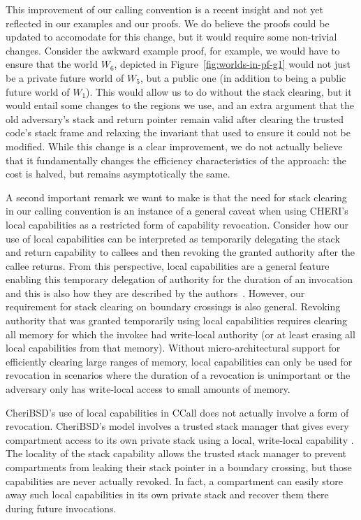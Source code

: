 \documentclass[format=acmsmall, review=true, screen=true]{acmart}
\begin{document}
This improvement of our calling convention is a recent insight and not yet reflected in our examples and our proofs.
We do believe the proofs could be updated to accomodate for this change, but it would require some non-trivial changes.
Consider the awkward example proof, for example, we would have to ensure that the world $W_6$, depicted in Figure~\ref{fig:worlds-in-pf-g1} would not just be a private future world of $W_5$, but a public one (in addition to being a public future world of $W_1$).
This would allow us to do without the stack clearing, but it would entail some changes to the regions we use, and an extra argument that the old adversary's stack and return pointer remain valid after clearing the trusted code's stack frame and relaxing the invariant that used to ensure it could not be modified.
While this change is a clear improvement, we do not actually believe that it fundamentally changes the efficiency characteristics of the approach: the cost is halved, but remains asymptotically the same.

A second important remark we want to make is that the need for stack clearing in our calling convention is an instance of a general caveat when using CHERI's local capabilities as a restricted form of capability revocation.
Consider how our use of local capabilities can be interpreted as temporarily delegating the stack and return capability to callees and then revoking the granted authority after the callee returns.
From this perspective, local capabilities are a general feature enabling this temporary delegation of authority for the duration of an invocation and this is also how they are described by the authors~\citep{Watson2015Cheri}.
However, our requirement for stack clearing on boundary crossings is also general.
Revoking authority that was granted temporarily using local capabilities requires clearing all memory for which the invokee had write-local authority (or at least erasing all local capabilities from that memory).
Without micro-architectural support for efficiently clearing large ranges of memory, local capabilities can only be used for revocation in scenarios where the duration of a revocation is unimportant or the adversary only has write-local access to small amounts of memory.

CheriBSD's use of local capabilities in CCall does not actually involve a form of revocation.
CheriBSD's model involves a trusted stack manager that gives every compartment access to its own private stack using a local, write-local capability \citep{Watson2015Cheri}.
The locality of the stack capability allows the trusted stack manager to prevent compartments from leaking their stack pointer in a boundary crossing, but those capabilities are never actually revoked.
In fact, a compartment can easily store away such local capabilities in its own private stack and recover them there during future invocations.
\end{document}
